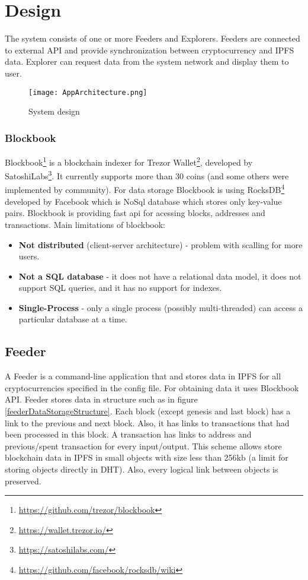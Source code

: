 \chapter{Design}

The system consists of one or more Feeders and Explorers. Feeders are connected to external API and provide synchronization between cryptocurrency and IPFS data. Explorer can request data from the system network and display them to user.

\begin{figure}[H]
    \centering
    \texttt{[image: AppArchitecture.png]}
    \caption{System design}
    \label{}
\end{figure}

\subsection{Blockbook}
Blockbook\footnote{\url{https://github.com/trezor/blockbook}} is a blockchain indexer for Trezor Wallet\footnote{\url{https://wallet.trezor.io/}}, developed by SatoshiLabs\footnote{\url{https://satoshilabs.com/}}. It currently supports more than 30 coins (and some others were implemented by community). For data storage Blockbook is using RocksDB\footnote{\url{https://github.com/facebook/rocksdb/wiki}} developed by Facebook which is NoSql database which stores only key-value pairs. Blockbook is providing fast api for acessing blocks, addresses and transactions. Main limitations of blockbook:
\begin{itemize}
    \item \textbf{Not distributed} (client-server architecture) - problem with scalling for more users. 
    \item \textbf{Not a SQL database} - it does not have a relational data model, it does not support SQL queries, and it has no support for indexes.
    \item \textbf{Single-Process} - only a single process (possibly multi-threaded) can access a particular database at a time.
\end{itemize}

\section{Feeder}
A Feeder is a command-line application that and stores data in IPFS for all cryptocurrencies specified in the config file. For obtaining data it uses Blockbook API. Feeder stores data in structure such as in figure \ref{feederDataStorageStructure}. Each block (except genesis and last block) has a link to the previous and next block. Also, it has links to transactions that had been processed in this block. A transaction has links to address and previous/spent transaction for every input/output. This scheme allows store blockchain data in IPFS in small objects with size less than 256kb (a limit for storing objects directly in DHT). Also, every logical link between objects is preserved. 

